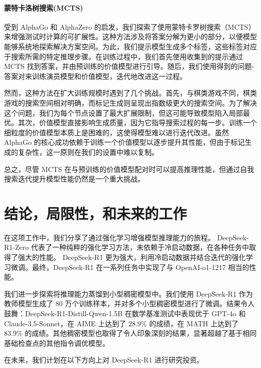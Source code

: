 \documentclass[lang=cn,a4paper,newtx]{elegantpaper}
\newcommand{\dsri}{DeepSeek-R1}
\newcommand{\dsro}{DeepSeek-R1-Zero}
\begin{document}
\paragraph{蒙特卡洛树搜索(MCTS)}

受到 AlphaGo 和 AlphaZero 的启发，我们探索了使用蒙特卡罗树搜索（MCTS）来增强测试时计算的可扩展性。这种方法涉及将答案分解为更小的部分，以便模型能够系统地探索解决方案空间。为此，我们提示模型生成多个标签，这些标签对应于搜索所需的特定推理步骤。在训练过程中，我们首先使用收集到的提示通过 MCTS 找到答案，并由预训练的价值模型进行引导。随后，我们使用得到的问题-答案对来训练演员模型和价值模型，迭代地改进这一过程。

然而，这种方法在扩大训练规模时遇到了几个挑战。首先，与棋类游戏不同，棋类游戏的搜索空间相对明确，而标记生成则呈现出指数级更大的搜索空间。为了解决这个问题，我们为每个节点设置了最大扩展限制，但这可能导致模型陷入局部最优。其次，价值模型直接影响生成质量，因为它指导搜索过程的每一步。训练一个细粒度的价值模型本质上是困难的，这使得模型难以进行迭代改进。虽然 AlphaGo 的核心成功依赖于训练一个价值模型以逐步提升其性能，但由于标记生成的复杂性，这一原则在我们的设置中难以复制。

总之，尽管 MCTS 在与预训练的价值模型配对时可以提高推理性能，但通过自我搜索迭代提升模型性能仍然是一个重大挑战。

\section{结论，局限性，和未来的工作}

在这项工作中，我们分享了通过强化学习增强模型推理能力的旅程。 \dsro{} 代表了一种纯粹的强化学习方法，未依赖于冷启动数据，在各种任务中取得了强大的性能。 \dsri{} 更为强大，利用冷启动数据并结合迭代的强化学习微调。最终，\dsri{} 在一系列任务中实现了与 OpenAI-o1-1217 相当的性能。

我们进一步探索将推理能力蒸馏到小型稠密模型中。我们使用 \dsri{} 作为教师模型生成了 80 万个训练样本，并对多个小型稠密模型进行了微调。结果令人鼓舞：DeepSeek-R1-Distill-Qwen-1.5B 在数学基准测试中表现优于 GPT-4o 和 Claude-3.5-Sonnet，在 AIME 上达到了 28.9\% 的成绩，在 MATH 上达到了 83.9\% 的成绩。其他稠密模型也取得了令人印象深刻的结果，显著超越了基于相同基础检查点的其他指令调优模型。

在未来，我们计划在以下方向上对 \dsri{} 进行研究投资。
\end{document}
